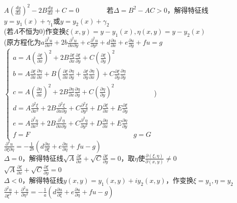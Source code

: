 \documentclass[10pt,a4paper]{article}
\begin{document}
\begin{multicols}{2}
$A(\frac{dy}{dx})^2-2B\frac{dy}{dx}+C=0$~~~~~~~~若$\Delta=B^2-AC>0$，解得特征线$y=y_1(x)+\gamma_1$或$y=y_2(x)+\gamma_2$\\
\indent\indent(若$A$不恒为$0$)作变换$\xi(x,y)=y-y_1(x),\eta(x,y)=y-y_2(x)$\\
\indent\indent(原方程化为\scriptsize$a\frac{\partial^2u}{\partial x^2}+2b\frac{\partial^2u}{\partial x\partial y}+c\frac{\partial^2u}{\partial y^2}+d\frac{\partial u}{\partial x}+e\frac{\partial u}{\partial y}+fu=g$\\
\indent{}$\left\{\begin{array}{ll}a=A(\frac{\partial\xi}{\partial x})^2+2B\frac{\partial\xi}{\partial x}\frac{\partial\xi}{\partial y}+C(\frac{\partial\xi}{\partial y})^2\\b=A\frac{\partial\xi}{\partial x}\frac{\partial\eta}{\partial x}+B(\frac{\partial\xi}{\partial x}\frac{\partial\eta}{\partial y}+\frac{\partial\xi}{\partial y}\frac{\partial\eta}{\partial x})+C\frac{\partial\xi}{\partial y}\frac{\partial\eta}{\partial y}\\c=A(\frac{\partial\eta}{\partial x})^2+2B\frac{\partial\eta}{\partial x}\frac{\partial\eta}{\partial y}+C(\frac{\partial\eta}{\partial y})^2\\d=A\frac{\partial^2\xi}{\partial x^2}+2B\frac{\partial^2\xi}{\partial x\partial y}+C\frac{\partial^2\xi}{\partial y^2}+D\frac{\partial\xi}{\partial x}+E\frac{\partial\xi}{\partial y}\\e=A\frac{\partial^2\eta}{\partial x^2}+2B\frac{\partial^2\eta}{\partial x\partial y}+C\frac{\partial^2\eta}{\partial y^2}+D\frac{\partial\eta}{\partial x}+E\frac{\partial\eta}{\partial y}\\f=F&g=G\end{array}\right.$)\\
\indent{}$\frac{\partial^2u}{\partial\xi\partial\eta}=-\frac{1}{2b}(d\frac{\partial u}{\partial\xi}+e\frac{\partial u}{\partial\eta}+fu-g)$\\
$\Delta=0$，解得特征线$\sqrt{A}\frac{\partial\xi}{\partial x}+\sqrt{C}\frac{\partial\xi}{\partial y}=0$，取$\eta$使$\frac{\partial(\xi,\eta)}{\partial(x,y)}\neq0$\\
\indent{}$\sqrt{A}\frac{\partial\xi}{\partial x}+\sqrt{C}\frac{\partial\xi}{\partial y}=0$\\
$\Delta<0$，解得特征线$y(x,y)=y_1(x,y)+iy_2(x,y)$，作变换$\xi=y_1,\eta=y_2$\\
\indent{}$\frac{\partial^2u}{\partial\xi^2}+\frac{\partial^2u}{\partial\eta^2}=-\frac{1}{a}(d\frac{\partial u}{\partial\xi}+e\frac{\partial u}{\partial\eta}+fu-g)$\\

\end{multicols}
\end{document}
